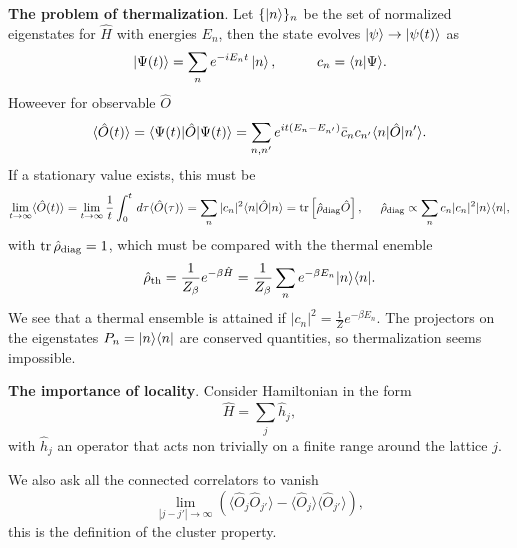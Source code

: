 
\textbf{The problem of thermalization}.
Let $\{\left| n \right\rangle\}_n$ be the set of normalized eigenstates for $\hat{H}$ with energies $E_n$, then the state evolves $\left| \psi \right\rangle \to \left| \psi(t) \right\rangle$ as
\begin{equation*}
	\ket{\Psi(t)} = \sum_n e^{- i E_n t} \ket{n},
	\hspace{10 mm} 
	c_n = \bk{n}{\Psi}.
\end{equation*}
Howeever for observable $\hat{O}$ 
\begin{equation*}
	\langle \hat{O}(t)\rangle = \bk{\Psi(t)}[\hat{O}]{\Psi(t)} = \sum_{n, n'} e^{it(E_n - E_{n'})} \bar{c}_n c_{n'} \bk{n}[\hat{O}]{n'}.
\end{equation*}
If a stationary value exists, this must be
\begin{equation*}
	\lim_{t \to \infty} \langle \hat{O}(t)\rangle = \lim_{t \to \infty} \frac{1}{t} \int_{0}^{t}  \d \tau \langle \hat{O}(\tau)\rangle = \sum_n |c_n|^2 \bk{n}[\hat{O}]{n} = \tr \left[ \hat{\rho}_{\text{diag}} \hat{O}\right],
	\hspace{5 mm} 
	\sub{\hat{\rho}}{diag} \propto \sum_n c_n |c_n|^2 \kb{n}{n},
\end{equation*}
with $\mathop{\mathrm{tr}}\nolimits \hat{\rho}_{\textnormal{diag}} = 1$, which must be compared with the thermal enemble
\begin{equation*}
	\sub{\hat{\rho}}{th} = \frac{1}{Z_\beta} e^{- \beta \hat{H}} = \frac{1}{Z_\beta} \sum_n e^{- \beta E_n} \kb{n}{n}.
\end{equation*}
We see that a thermal ensemble is attained if $|c_n|^2 = \frac{1}{Z} e^{-\beta E_n}$. The projectors on the eigenstates $P_n = \kb{n}{n}$ are conserved quantities, so thermalization seems impossible.


\textbf{The importance of locality}. Consider Hamiltonian in the form
\begin{equation*}
	\hat{H} = \sum_j \hat{h}_j,
\end{equation*}
with $\hat{h}_j$ an operator that acts non trivially on a finite range around the lattice $j$. 

We also ask all the connected correlators to vanish
\begin{equation*}
	\lim_{|j - j'| \to \infty } \left(
		\langle \hat{O}_j \hat{O}_{j'}\rangle - \langle \hat{O}_j\rangle \langle \hat{O}_{j'}\rangle
	\right),
\end{equation*}
this is the definition of the cluster property.


